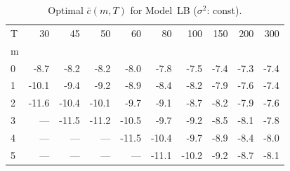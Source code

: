 \begin{table}
\caption{Optimal $\bar c(m,T)$ for Model~LB ($\sigma^2$: const).}
\label{tab:cbar}
\begin{tabular}{lrrrrrrrrr}
\toprule
T & 30 & 45 & 50 & 60 & 80 & 100 & 150 & 200 & 300 \\
m &  &  &  &  &  &  &  &  &  \\
\midrule
0 & -8.7 & -8.2 & -8.2 & -8.0 & -7.8 & -7.5 & -7.4 & -7.3 & -7.4 \\
1 & -10.1 & -9.4 & -9.2 & -8.9 & -8.4 & -8.2 & -7.9 & -7.6 & -7.4 \\
2 & -11.6 & -10.4 & -10.1 & -9.7 & -9.1 & -8.7 & -8.2 & -7.9 & -7.6 \\
3 & --- & -11.5 & -11.2 & -10.5 & -9.7 & -9.2 & -8.5 & -8.1 & -7.8 \\
4 & --- & --- & --- & -11.5 & -10.4 & -9.7 & -8.9 & -8.4 & -8.0 \\
5 & --- & --- & --- & --- & -11.1 & -10.2 & -9.2 & -8.7 & -8.1 \\
\bottomrule
\end{tabular}
\end{table}

